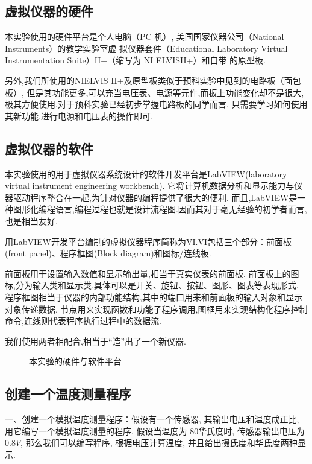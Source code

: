 \documentclass[11pt]{article}
\begin{document}
\subsection{虚拟仪器的硬件}
本实验使用的硬件平台是个人电脑（PC 机）, 美国国家仪器公司（National Instruments）的教学实验室虚
拟仪器套件（Educational Laboratory Virtual Instrumentation Suite）II+（缩写为 NI ELVISII+）和自带
的原型板.

另外,我们所使用的NIELVIS II+及原型板类似于预科实验中见到的电路板（面包板）,
但是其功能更多,可以充当电压表、电源等元件,而板上功能变化却不是很大,
极其方便使用.对于预科实验已经初步掌握电路板的同学而言,
只需要学习如何使用其新功能,进行电源和电压表的操作即可.

\subsection{虚拟仪器的软件}

本实验使用的用于虚拟仪器系统设计的软件开发平台是LabVIEW(laboratory virtual instrument engineering workbench).
它将计算机数据分析和显示能力与仪器驱动程序整合在一起,为针对仪器的编程提供了很大的便利.
而且,LabVIEW是一种图形化编程语言,编程过程也就是设计流程图.因而其对于毫无经验的初学者而言,也是相当友好.

用LabVIEW开发平台编制的虚拟仪器程序简称为VI.VI包括三个部分：前面板(front panel)、程序框图(Block diagram)和图标/连线板.

前面板用于设置输入数值和显示输出量,相当于真实仪表的前面板.
前面板上的图标,分为输入类和显示类,具体可以是开关、旋钮、按钮、图形、图表等表现形式.
程序框图相当于仪器的内部功能结构,其中的端口用来和前面板的输入对象和显示对象传递数据,
节点用来实现函数和功能子程序调用,图框用来实现结构化程序控制命令,连线则代表程序执行过程中的数据流.

我们使用两者相配合,相当于“造”出了一个新仪器.

\begin{figure}[htb]
    \centering
    \hspace{0.5cm}
    \caption{本实验的硬件与软件平台}
\end{figure}

\subsection{创建一个温度测量程序}

一、创建一个模拟温度测量程序：假设有一个传感器, 其输出电压和温度成正比, 用它编写一个模拟温度测量的程序. 
假设当温度为 $80$华氏度时, 传感器输出电压为 $0.8 V$, 那么我们可以编写程序, 根据电压计算温度, 并且给出摄氏度和华氏度两种显示.
\end{document}
